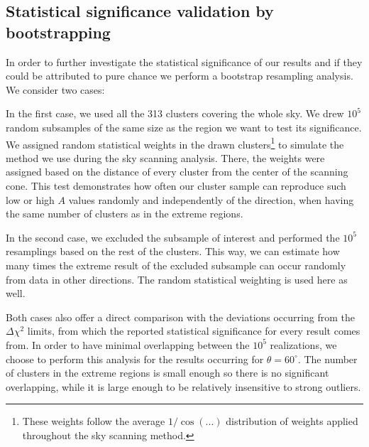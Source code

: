 \documentclass{aa}   %
\begin{document}
\subsection{Statistical significance validation by bootstrapping} \label{boot_section}

In order to further investigate the statistical significance of our results and if they could be attributed to pure chance we perform a bootstrap resampling analysis. We consider two cases: 

In the first case, we used all the 313 clusters covering the whole sky. We drew $10^5$ random subsamples of the same size as the region we want to test its significance. We assigned random statistical weights in the drawn clusters\footnote{These weights follow the average $1/\cos{(...)}$ distribution of weights applied throughout the sky scanning method.} to simulate the method we use during the sky scanning analysis. There, the weights were assigned based on the distance of every cluster from the center of the scanning cone. This test demonstrates how often our cluster sample can reproduce such low or high $A$ values randomly and independently of the direction, when having the same number of clusters as in the extreme regions.

In the second case, we excluded the subsample of interest and performed the $10^5$ resamplings based on the rest of the clusters. This way, we can estimate how many times the extreme result of the excluded subsample can occur randomly from data in other directions. The random statistical weighting is used here as well. 

Both cases also offer a direct comparison with the deviations occurring from the $\Delta \chi^2$ limits, from which the reported statistical significance for every result comes from. 
In order to have minimal overlapping between the $10^5$ realizations, we choose to perform this analysis for the results occurring for $\theta=60^{\circ}$. The number of clusters in the extreme regions is small enough so there is no significant overlapping, while it is large enough to be relatively insensitive to strong outliers.
\end{document}
